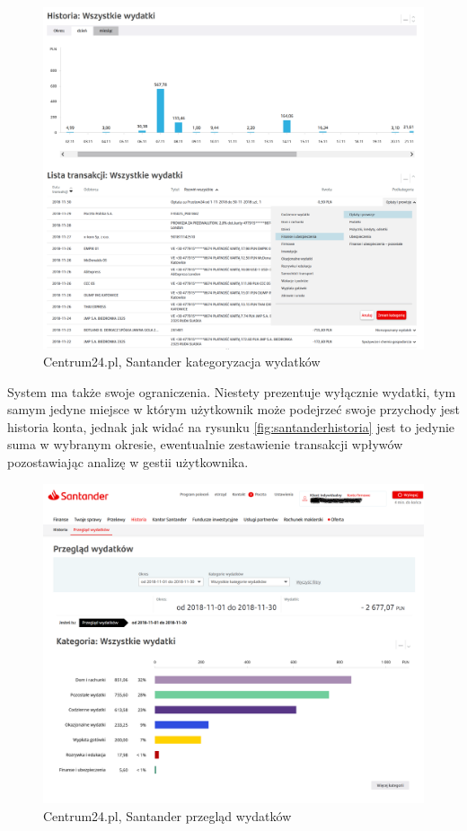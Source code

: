 \documentclass[a4paper, 10pt, twoside, openright]{report}
\begin{document}
\begin{large}
\begin{figure}[H]
    \includegraphics[width=12cm]{figures/Santander_PrzegladWydatkow_kategoryzacja.png}
    \caption{Centrum24.pl, Santander kategoryzacja wydatków}
    \label{fig:santanderkategoryzacja}
\end{figure}

{System ma także swoje ograniczenia. Niestety prezentuje wyłącznie wydatki, tym 
samym jedyne miejsce w którym użytkownik może podejrzeć swoje przychody jest 
historia konta, jednak jak widać na rysunku \ref{fig:santanderhistoria} jest to 
jedynie suma w wybranym okresie, ewentualnie zestawienie transakcji wpływów 
pozostawiając analizę w gestii użytkownika.}

\begin{figure}[H]           %
    \centering
    \includegraphics[width=12cm]{figures/Santander_PrzegladWydatkow_przeglad.png}
    \caption{Centrum24.pl, Santander przegląd wydatków}
    \label{fig:santanderprzeglad}
\end{figure}


\end{large}
\end{document}
